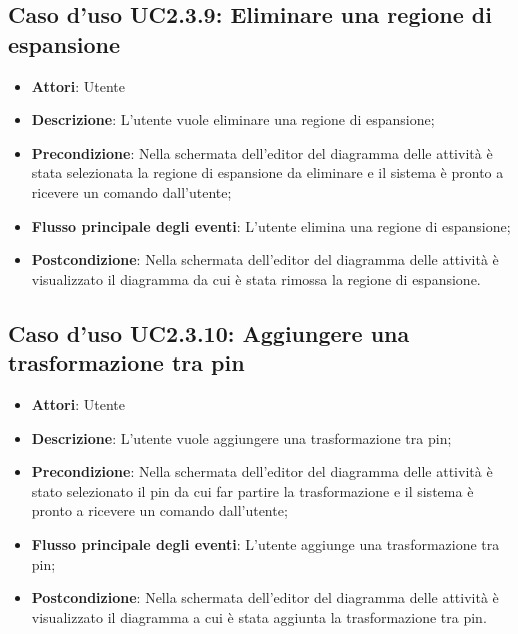 \documentclass[../AnalisiDeiRequisiti.tex]{subfiles}
\begin{document}
					\subsection{Caso d'uso UC2.3.9: Eliminare una regione di espansione}
					\begin{itemize}
						\item \textbf{Attori}: Utente
						\item \textbf{Descrizione}: L'utente vuole eliminare una regione di espansione;
						\item \textbf{Precondizione}: Nella schermata dell'editor del diagramma delle attività è stata selezionata la regione di espansione da eliminare e il sistema è pronto a ricevere un comando dall'utente;
						\item \textbf{Flusso principale degli eventi}: L'utente elimina una regione di espansione;
						\item \textbf{Postcondizione}: Nella schermata dell'editor del diagramma delle attività è visualizzato il diagramma da cui è stata rimossa la regione di espansione.
					\end{itemize}
					\subsection{Caso d'uso UC2.3.10: Aggiungere una trasformazione tra pin}
					\begin{itemize}
						\item \textbf{Attori}: Utente
						\item \textbf{Descrizione}: L'utente vuole aggiungere una trasformazione tra pin;
						\item \textbf{Precondizione}: Nella schermata dell'editor del diagramma delle attività è stato selezionato il pin da cui far partire la trasformazione e il sistema è pronto a ricevere un comando dall'utente;
						\item \textbf{Flusso principale degli eventi}: L'utente aggiunge una trasformazione tra pin;
						\item \textbf{Postcondizione}: Nella schermata dell'editor del diagramma delle attività è visualizzato il diagramma a cui è stata aggiunta la trasformazione tra pin.
					\end{itemize}
\end{document}
